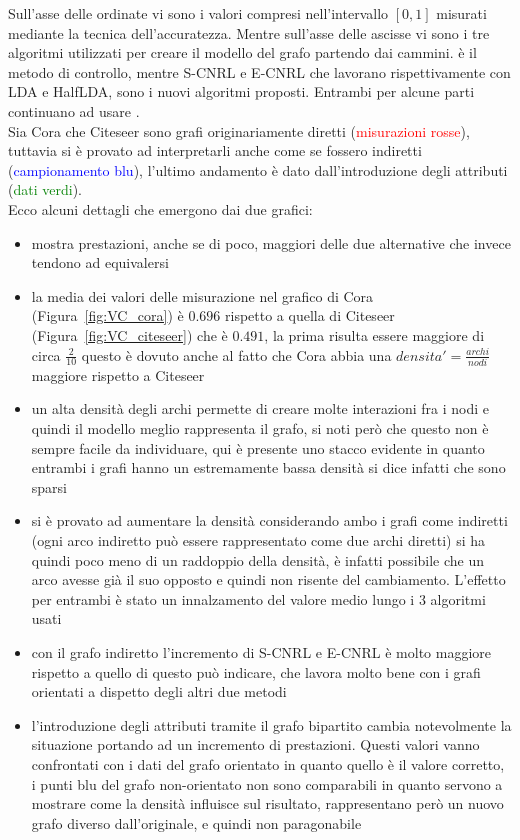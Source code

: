 %
Sull'asse delle ordinate vi sono i valori compresi nell'intervallo $[0, 1]$ misurati mediante la tecnica dell'accuratezza. Mentre sull'asse delle ascisse vi sono i tre algoritmi utilizzati per creare il modello del grafo partendo dai cammini. \wv è il metodo di controllo, mentre S-CNRL e E-CNRL che lavorano rispettivamente con LDA e HalfLDA, sono i nuovi algoritmi proposti. Entrambi per alcune parti continuano ad usare \wv.\\
Sia Cora che Citeseer sono grafi originariamente diretti (\textcolor{red}{misurazioni rosse}), tuttavia si è provato ad interpretarli anche come se fossero indiretti (\textcolor{blue}{campionamento blu}), l'ultimo andamento è dato dall'introduzione degli attributi (\textcolor{green}{dati verdi}).\\
Ecco alcuni dettagli che emergono dai due grafici:
\begin{itemize}
	\item \wv mostra prestazioni, anche se di poco, maggiori delle due alternative che invece tendono ad equivalersi
	\item la media dei valori delle misurazione nel grafico di Cora (Figura~\ref{fig:VC_cora}) è $0.696$ rispetto a quella di Citeseer (Figura~\ref{fig:VC_citeseer}) che è $0.491$, la prima risulta essere maggiore di circa $\displaystyle \frac{2}{10}$ questo è dovuto anche al fatto che Cora abbia una $\displaystyle densita' = \frac{archi}{nodi}$ maggiore rispetto a Citeseer
	\item un alta densità degli archi permette di creare molte interazioni fra i nodi e quindi il modello meglio rappresenta il grafo, si noti però che questo non è sempre facile da individuare, qui è presente uno stacco evidente in quanto entrambi i grafi hanno un estremamente bassa densità si dice infatti che sono sparsi
	\item si è provato ad aumentare la densità considerando ambo i grafi come indiretti (ogni arco indiretto può essere rappresentato come due archi diretti) si ha quindi poco meno di un raddoppio della densità, è infatti possibile che un arco avesse già il suo opposto e quindi non risente del cambiamento.
	L'effetto per entrambi è stato un innalzamento del valore medio lungo i 3 algoritmi usati
	\item con il grafo indiretto l'incremento di S-CNRL e E-CNRL è molto maggiore rispetto a quello di \wv questo può indicare, che \wv lavora molto bene con i grafi orientati a dispetto degli altri due metodi
	\item l'introduzione degli attributi tramite il grafo bipartito cambia notevolmente la situazione portando ad un incremento di prestazioni. Questi valori vanno confrontati con i dati del grafo orientato in quanto quello è il valore corretto, i punti blu del grafo non-orientato non sono comparabili in quanto servono a mostrare come la densità influisce sul risultato, rappresentano però un nuovo grafo diverso dall'originale, e quindi non paragonabile
\end{itemize}
%
